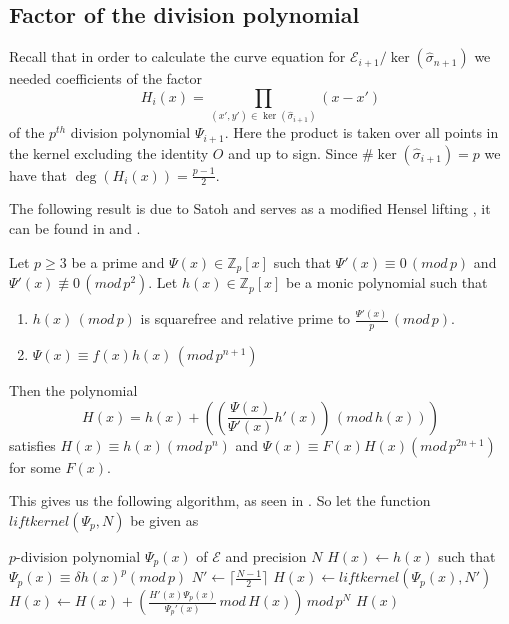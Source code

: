 \subsection{Factor of the division polynomial} \label{satohdiv}
Recall that in order to calculate the curve equation for $\mathscr{E}_{i+1}/\ker(\widehat{\sigma}_{n+1})$
we needed coefficients of the factor
$$H_i(x) = \prod_{(x',y')\in \ker(\widehat{\sigma}_{i+1})} (x-x')$$
of the $p^{th}$ division polynomial $\Psi_{i+1}$. Here the product is taken over all points in
the kernel excluding the identity $O$ and up to sign. Since $\#\ker(\widehat{\sigma}_{i+1}) = p$ we have
that $\deg(H_i(x)) = \frac{p-1}{2}$.

The following result is due to Satoh and serves as a modified Hensel lifting \cite{Robert}, it can be found
in \cite{Satoh} and \cite{Handbook}.
\begin{prop}
 Let $p\geq 3$ be a prime and $\Psi(x) \in \mathbb{Z}_p[x]$ such that $\Psi'(x) \equiv 0\, (mod\, p)$ and
$\Psi'(x) \not\equiv 0\, (mod\, p^2)$. Let $h(x) \in \mathbb{Z}_p[x]$ be a monic polynomial such that
\begin{enumerate}
  \item $h(x) \,(mod\,p)$ is squarefree and relative prime to $\frac{\Psi'(x)}{p}\,(mod\,p)$.
  \item $\Psi(x) \equiv f(x)h(x)\,(mod\,p^{n+1})$
\end{enumerate}
Then the polynomial
$$H(x) = h(x) + \left(\left(\frac{\Psi(x)}{\Psi'(x)} h'(x)\right)\,(mod\, h(x))\right)$$
satisfies $H(x) \equiv h(x) (mod\, p^n)$ and $\Psi(x) \equiv F(x)H(x) (mod \, p^{2n+1})$ for some $F(x)$.
\end{prop}
This gives us the following algorithm, as seen in \cite{Handbook}. So let the function
$liftkernel(\Psi_p, N)$ be given as
\begin{algorithmic}
\REQUIRE $p$-division polynomial $\Psi_p(x)$ of $\mathscr{E}$ and precision $N$
        \STATE $H(x)\gets h(x)$ such that $\Psi_p(x) \equiv \delta h(x)^p (mod\, p)$
\ELSE
        \STATE $N'\gets \lceil\frac{N-1}{2}\rceil$
	\STATE $H(x)\gets liftkernel(\Psi_p(x), N')$
	\STATE $H(x)\gets H(x) + \left(\frac{H'(x)\Psi_p(x)}{\Psi_p'(x)} \, mod\, H(x) \right)\, mod\, p^N$
\ENDIF
\RETURN $H(x)$
\end{algorithmic}
